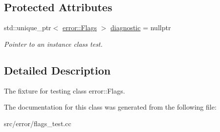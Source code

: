 \subsection*{Protected Attributes}
\begin{DoxyCompactItemize}
\item 
\hypertarget{class_error_flags_test_ad93619dfba84c24ed82eee5724e769ef}{}\label{class_error_flags_test_ad93619dfba84c24ed82eee5724e769ef} 
std\+::unique\+\_\+ptr$<$ \hyperlink{structae_1_1error_1_1_flags}{error\+::\+Flags} $>$ \hyperlink{class_error_flags_test_ad93619dfba84c24ed82eee5724e769ef}{diagnostic} = nullptr
\begin{DoxyCompactList}\small\item\em Pointer to an instance class test. \end{DoxyCompactList}\end{DoxyCompactItemize}


\subsection{Detailed Description}
The fixture for testing class error\+::\+Flags. 

The documentation for this class was generated from the following file\+:\begin{DoxyCompactItemize}
\item 
src/error/flags\+\_\+test.\+cc\end{DoxyCompactItemize}
